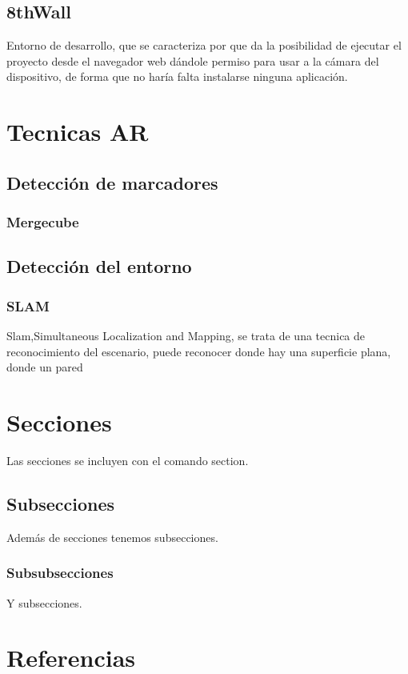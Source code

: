\subsection{8thWall}
Entorno de desarrollo, que se caracteriza por que da la posibilidad de ejecutar el proyecto desde el navegador web dándole permiso para usar a la cámara del dispositivo, de forma que no haría falta instalarse ninguna aplicación.


\section{Tecnicas AR}
	\subsection{Detección de marcadores}
	\subsubsection{Mergecube}
	\subsection{Detección del entorno}
	\subsubsection{SLAM}
	Slam,Simultaneous Localization and Mapping, se trata de una tecnica de reconocimiento del escenario, puede reconocer donde hay una superficie plana, donde un pared
	
	
	
\section{Secciones}

Las secciones se incluyen con el comando section.

\subsection{Subsecciones}

Además de secciones tenemos subsecciones.

\subsubsection{Subsubsecciones}

Y subsecciones. 


\section{Referencias}

